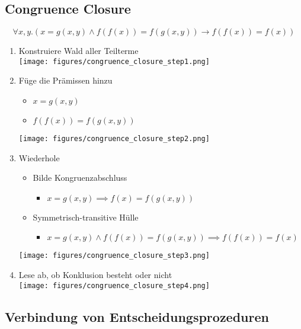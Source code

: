 \documentclass{scrartcl}
\begin{document}
\subsection{Congruence Closure}

\begin{equation*}
	\forall x,y.(x = g(x,y) \wedge f(f(x)) = f(g(x,y)) \rightarrow f(f(x)) = f(x))
\end{equation*}

\begin{enumerate}
	\item Konstruiere Wald aller Teilterme \\
	\texttt{[image: figures/congruence\_closure\_step1.png]}
	\item Füge die Prämissen hinzu
	\begin{itemize}
		\item $ x = g(x,y) $
		\item $ f(f(x)) = f(g(x,y)) $
	\end{itemize}
	\texttt{[image: figures/congruence\_closure\_step2.png]}
	\item Wiederhole
	\begin{itemize}
		\item Bilde Kongruenzabschluss
		\begin{itemize}
			\item $ x = g(x,y)  \implies f(x) = f(g(x,y)) $
		\end{itemize}
		\item Symmetrisch-transitive Hülle
		\begin{itemize}
			\item $ x = g(x,y) \wedge f(f(x)) = f(g(x,y)) \implies f(f(x)) = f(x) $
		\end{itemize}
	\end{itemize}
	\texttt{[image: figures/congruence\_closure\_step3.png]}
	\item Lese ab, ob Konklusion besteht oder nicht \\
	\texttt{[image: figures/congruence\_closure\_step4.png]}
\end{enumerate}

\subsection{Verbindung von Entscheidungsprozeduren}
\end{document}
